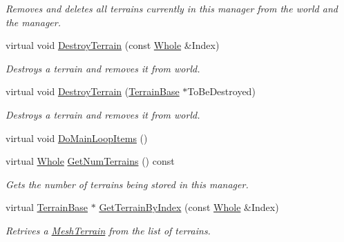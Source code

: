 \begin{DoxyCompactItemize}
\begin{DoxyCompactList}\small\item\em Removes and deletes all terrains currently in this manager from the world and the manager. \item\end{DoxyCompactList}\item 
virtual void \hyperlink{classMezzanine_1_1TerrainManager_a058a5c44e55fb80a03a2076effc424c3}{DestroyTerrain} (const \hyperlink{namespaceMezzanine_adcbb6ce6d1eb4379d109e51171e2e493}{Whole} \&Index)
\begin{DoxyCompactList}\small\item\em Destroys a terrain and removes it from world. \item\end{DoxyCompactList}\item 
virtual void \hyperlink{classMezzanine_1_1TerrainManager_aadac3792e3b2819e7ac0dec84a8399b6}{DestroyTerrain} (\hyperlink{classMezzanine_1_1TerrainBase}{TerrainBase} $\ast$ToBeDestroyed)
\begin{DoxyCompactList}\small\item\em Destroys a terrain and removes it from world. \item\end{DoxyCompactList}\item 
virtual void \hyperlink{classMezzanine_1_1TerrainManager_a442a1e72a38fe959b15a7f5eeff455fc}{DoMainLoopItems} ()
\item 
virtual \hyperlink{namespaceMezzanine_adcbb6ce6d1eb4379d109e51171e2e493}{Whole} \hyperlink{classMezzanine_1_1TerrainManager_a586514cfc367b5852612292cab69a8b7}{GetNumTerrains} () const 
\begin{DoxyCompactList}\small\item\em Gets the number of terrains being stored in this manager. \item\end{DoxyCompactList}\item 
virtual \hyperlink{classMezzanine_1_1TerrainBase}{TerrainBase} $\ast$ \hyperlink{classMezzanine_1_1TerrainManager_a6ac0d776447d798c07f801b29109228b}{GetTerrainByIndex} (const \hyperlink{namespaceMezzanine_adcbb6ce6d1eb4379d109e51171e2e493}{Whole} \&Index)
\begin{DoxyCompactList}\small\item\em Retrives a \hyperlink{classMezzanine_1_1MeshTerrain}{MeshTerrain} from the list of terrains. \item\end{DoxyCompactList}\item 

\end{DoxyCompactItemize}

